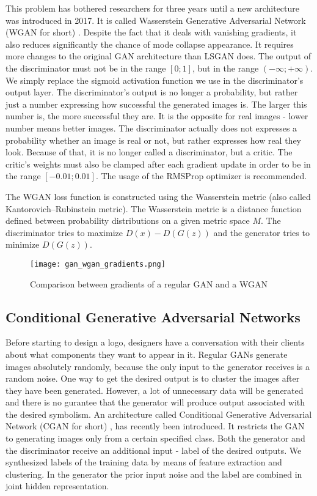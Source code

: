 \documentclass{article}
\begin{document}
This problem has bothered researchers for three years until a new architecture was introduced in 2017. It is called Wasserstein Generative Adversarial Network (WGAN for short) \cite{arjovsky2017wasserstein}. Despite the fact that it deals with vanishing gradients, it also reduces significantly the chance of mode collapse appearance. It requires more changes to the original GAN architecture than LSGAN does. The output of the discriminator must not be in the range $[0; 1]$, but in the range $(-\infty; +\infty)$. We simply replace the sigmoid activation function we use in the discriminator's output layer. The discriminator's output is no longer a probability, but rather just a number expressing how successful the generated images is. The larger this number is, the more successful they are. It is the opposite for real images - lower number means better images. The discriminator actually does not expresses a probability whether an image is real or not, but rather expresses how real they look. Because of that, it is no longer called a discriminator, but a critic. The critic's weights must also be clamped after each gradient update in order to be in the range $[-0.01; 0.01]$. The usage of the RMSProp optimizer is recommended.

The WGAN loss function is constructed using the Wasserstein metric (also called Kantorovich–Rubinstein metric). The Wasserstein metric is a distance function defined between probability distributions on a given metric space $M$. The discriminator tries to maximize $D(x) - D(G(z))$ and the generator tries to minimize $D(G(z))$.

\begin{figure}[ht]
    \centering
    \texttt{[image: gan\_wgan\_gradients.png]}
    \caption{Comparison between gradients of a regular GAN and a WGAN}
    \label{fig:comparison_of_gradients}
\end{figure}


\subsection{Conditional Generative Adversarial Networks}
Before starting to design a logo, designers have a conversation with their clients about what components they want to appear in it. Regular GANs generate images absolutely randomly, because the only input to the generator receives is a random noise. One way to get the desired output is to cluster the images after they have been generated. However, a lot of unnecessary data will be generated and there is no gurantee that the generator will produce output associated with the desired symbolism. An architecture called Conditional Generative Adversarial Network (CGAN for short) \cite{mirza2014conditional}, has recently been introduced. It restricts the GAN to generating images only from a certain specified class. Both the generator and the discriminator receive an additional input - label of the desired outputs. We synthesized labels of the training data by means of feature extraction and clustering. In the generator the prior input noise and the label are combined in joint hidden representation.
\end{document}

